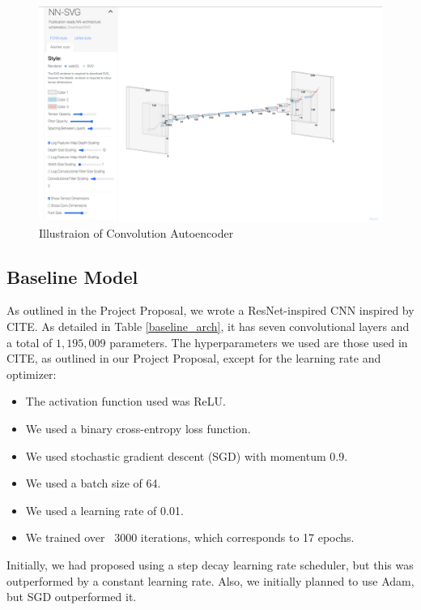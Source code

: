 \documentclass{article} %
\begin{document}
\begin{figure}[h]
    \centering
    \includegraphics[width=1\textwidth]{figs/cae_illustration.png}
    \caption{Illustraion of Convolution Autoencoder}
    \label{fig:cae}
\end{figure}

\subsection{Baseline Model}

As outlined in the Project Proposal, we wrote a ResNet-inspired CNN inspired by CITE. As detailed in Table \ref{baseline_arch}, it has seven convolutional layers and a total of $1,195,009$ parameters. The hyperparameters we used are those used in CITE, as outlined in our Project Proposal, except for the learning rate and optimizer:
\begin{itemize}
    \item The activation function used was ReLU.
    \item We used a binary cross-entropy loss function.
    \item We used stochastic gradient descent (SGD) with momentum 0.9.
    \item We used a batch size of 64.
    \item We used a learning rate of 0.01.
    \item We trained over ~3000 iterations, which corresponds to 17 epochs.
\end{itemize}

Initially, we had proposed using a step decay learning rate scheduler, but this was outperformed by a constant learning rate. Also, we initially planned to use Adam, but SGD outperformed it.
\end{document}
